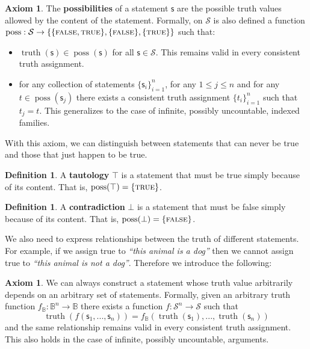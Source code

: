 \documentclass[letterpaper]{article}
\theoremstyle{plain}%
\theoremstyle{definition}
\newtheorem{defn}[thrm]{Definition}
\newtheorem{axiom}[thrm]{Axiom}
\theoremstyle{remark}
\numberwithin{equation}{section}
\DeclareMathOperator{\truth}{truth}
\DeclareMathOperator{\possFn}{poss}
\def\TRUE{\textsc{true}}
\def\FALSE{\textsc{false}}
\def\tautology{\top}
\def\contradiction{\bot}
\newcommand{\stmt}[1][s] {\mathsf{#1}}
\newcommand{\statement}[1] {\emph{``#1''}}
\begin{document}
\begin{axiom}\label{ax_possibilities}
	The \textbf{possibilities} of a statement $\stmt$ are the possible truth values allowed by the content of the statement. Formally, on $\mathcal{S}$ is also defined a function $\possFn: \mathcal{S} \to \{\{\FALSE, \TRUE\},\{\FALSE\},\{\TRUE\}\}$ such that:
	\begin{itemize}
		\item $\truth(\stmt) \in \possFn(\stmt)$ for all $\stmt \in \mathcal{S}$. This remains valid in every consistent truth assignment.
		\item for any collection of statements $\{\stmt_i\}^n_{i=1}$, for any $1 \leq j \leq n$ and for any $t \in \possFn(\stmt_j)$ there exists a consistent truth assignment $\{t_i\}^n_{i=1}$ such that $t_j = t$. This generalizes to the case of infinite, possibly uncountable, indexed families.
	\end{itemize}
\end{axiom}

With this axiom, we can distinguish between statements that can never be true and those that just happen to be true.

\begin{defn}
	A \textbf{tautology} $\tautology$ is a statement that must be true simply because of its content. That is, $\possFn(\tautology) = \{\TRUE\}$.
\end{defn}

\begin{defn}
	A \textbf{contradiction} $\contradiction$ is a statement that must be false simply because of its content. That is, $\possFn(\contradiction) = \{\FALSE\}$.
\end{defn}

We also need to express relationships between the truth of different statements. For example, if we assign true to \statement{this animal is a dog} then we cannot assign true to \statement{this animal is not a dog}. Therefore we introduce the following:


\begin{axiom}\label{ax_functions_of_statement}
	We can always construct a statement whose truth value arbitrarily depends on an arbitrary set of statements. Formally, given an arbitrary truth function $f_{\mathbb{B}} : \mathbb{B}^n \to \mathbb{B}$ there exists a function $f : \mathcal{S}^n \to \mathcal{S}$ such that
	$$\truth(f(\stmt_1, ..., \stmt_n)) = f_{\mathbb{B}}(\truth(\stmt_1), ..., \truth(\stmt_n))$$
	and the same relationship remains valid in every consistent truth assignment. This also holds in the case of infinite, possibly uncountable, arguments.
\end{axiom}
\end{document}
